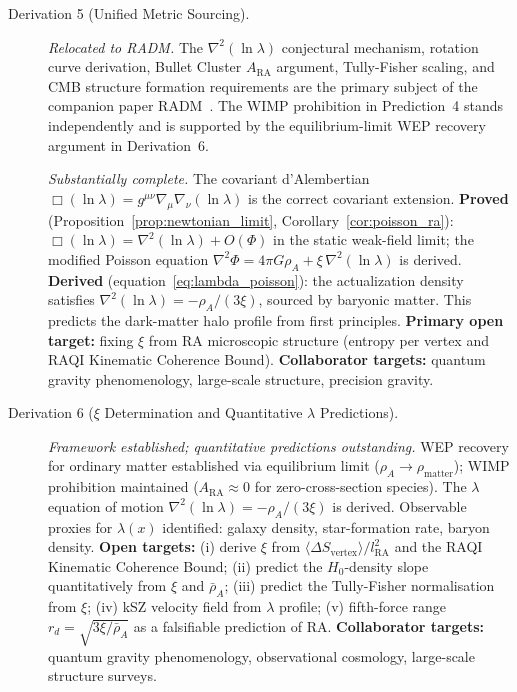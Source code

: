 \documentclass[11pt,a4paper]{article}
\theoremstyle{plain}
\theoremstyle{definition}
\theoremstyle{remark}
\begin{document}
\begin{description}
  \item[Derivation 5 (Unified Metric Sourcing).] \textit{Relocated to RADM.}
  The $\nabla^2(\ln\lambda)$ conjectural mechanism, rotation curve derivation,
  Bullet Cluster $A_{\mathrm{RA}}$ argument, Tully-Fisher scaling, and CMB
  structure formation requirements are the primary subject of the companion paper
  RADM~\citep{Sandeman2026RADM}. The WIMP prohibition in Prediction~4 stands
  independently and is supported by the equilibrium-limit WEP recovery argument
  in Derivation~6.

  \textit{Substantially complete.} The covariant d'Alembertian
  $\Box(\ln\lambda) = g^{\mu\nu}\nabla_\mu\nabla_\nu(\ln\lambda)$ is
  the correct covariant extension.
  \textbf{Proved} (Proposition~\ref{prop:newtonian_limit},
  Corollary~\ref{cor:poisson_ra}): $\Box(\ln\lambda) = \nabla^2(\ln\lambda)
  + O(\Phi)$ in the static weak-field limit; the modified Poisson equation
  $\nabla^2\Phi = 4\pi G\rho_A + \xi\,\nabla^2(\ln\lambda)$ is derived.
  \textbf{Derived} (equation~\eqref{eq:lambda_poisson}): the actualization
  density satisfies $\nabla^2(\ln\lambda) = -\rho_A/(3\xi)$, sourced by
  baryonic matter. This predicts the dark-matter halo profile from
  first principles.
  \textbf{Primary open target:} fixing $\xi$ from RA microscopic
  structure (entropy per vertex and RAQI Kinematic Coherence Bound).
  \textbf{Collaborator targets:} quantum gravity phenomenology,
  large-scale structure, precision gravity.

  \item[Derivation 6 ($\xi$ Determination and Quantitative $\lambda$ Predictions).]
  \textit{Framework established; quantitative predictions outstanding.}
  WEP recovery for ordinary matter established via equilibrium limit
  ($\rho_A \to \rho_{\mathrm{matter}}$); WIMP prohibition maintained
  ($A_{\mathrm{RA}} \approx 0$ for zero-cross-section species).
  The $\lambda$ equation of motion $\nabla^2(\ln\lambda) = -\rho_A/(3\xi)$
  is derived. Observable proxies for $\lambda(x)$ identified:
  galaxy density, star-formation rate, baryon density.
  \textbf{Open targets:} (i) derive $\xi$ from
  $\langle\Delta S_{\mathrm{vertex}}\rangle/l_{\mathrm{RA}}^2$ and the
  RAQI Kinematic Coherence Bound; (ii) predict the $H_0$-density slope
  quantitatively from $\xi$ and $\bar\rho_A$; (iii) predict the
  Tully-Fisher normalisation from $\xi$; (iv) kSZ velocity field from
  $\lambda$ profile; (v) fifth-force range $r_d = \sqrt{3\xi/\bar\rho_A}$
  as a falsifiable prediction of RA.
  \textbf{Collaborator targets:} quantum gravity phenomenology,
  observational cosmology, large-scale structure surveys.
\end{description}
\end{document}
